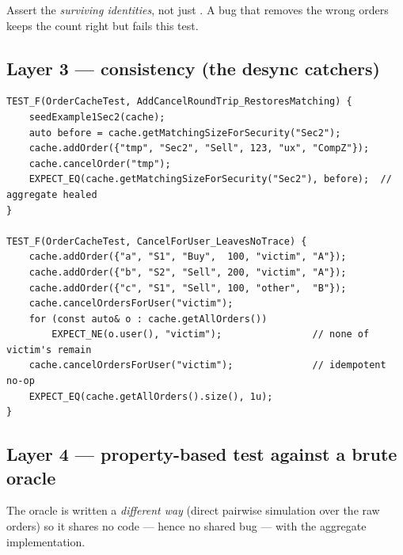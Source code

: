 \begin{pitfall}
Assert the \emph{surviving identities}, not just . A bug that removes
the wrong orders keeps the count right but fails this test.
\end{pitfall}

\subsection{Layer 3 --- consistency (the desync catchers)}

\begin{lstlisting}
TEST_F(OrderCacheTest, AddCancelRoundTrip_RestoresMatching) {
    seedExample1Sec2(cache);
    auto before = cache.getMatchingSizeForSecurity("Sec2");
    cache.addOrder({"tmp", "Sec2", "Sell", 123, "ux", "CompZ"});
    cache.cancelOrder("tmp");
    EXPECT_EQ(cache.getMatchingSizeForSecurity("Sec2"), before);  // aggregate healed
}

TEST_F(OrderCacheTest, CancelForUser_LeavesNoTrace) {
    cache.addOrder({"a", "S1", "Buy",  100, "victim", "A"});
    cache.addOrder({"b", "S2", "Sell", 200, "victim", "A"});
    cache.addOrder({"c", "S1", "Sell", 100, "other",  "B"});
    cache.cancelOrdersForUser("victim");
    for (const auto& o : cache.getAllOrders())
        EXPECT_NE(o.user(), "victim");                // none of victim's remain
    cache.cancelOrdersForUser("victim");              // idempotent no-op
    EXPECT_EQ(cache.getAllOrders().size(), 1u);
}
\end{lstlisting}

\subsection{Layer 4 --- property-based test against a brute oracle}

The oracle is written a \emph{different way} (direct pairwise simulation over the
raw orders) so it shares no code --- hence no shared bug --- with the aggregate
implementation.

